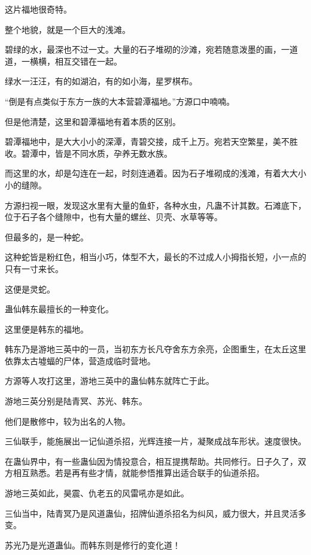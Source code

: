 
\begin{this_body}



这片福地很奇特。

整个地貌，就是一个巨大的浅滩。

碧绿的水，最深也不过一丈。大量的石子堆砌的沙滩，宛若随意泼墨的画，一道道，一横横，相互交错在一起。

绿水一汪汪，有的如湖泊，有的如小海，星罗棋布。

“倒是有点类似于东方一族的大本营碧潭福地。”方源口中喃喃。

但是他清楚，这里和碧潭福地有着本质的区别。

碧潭福地中，是大大小小的深潭，青碧交接，成千上万。宛若天空繁星，美不胜收。碧潭中，皆是不同水质，孕养无数水族。

而这里的水，却是勾连在一起，时刻连通着。因为石子堆砌成的浅滩，有着大大小小的缝隙。

方源扫视一眼，发现这水里有大量的鱼虾，各种水虫，凡蛊不计其数。石滩底下，位于石子各个缝隙中，也有大量的螺丝、贝壳、水草等等。

但最多的，是一种蛇。

这种蛇皆是粉红色，相当小巧，体型不大，最长的不过成人小拇指长短，小一点的只有一寸来长。

这便是灵蛇。

蛊仙韩东最擅长的一种变化。

这里便是韩东的福地。

韩东乃是游地三英中的一员，当初东方长凡夺舍东方余亮，企图重生，在太丘这里依靠太古墟蝠的尸体，营造成临时营地。

方源等人攻打这里，游地三英中的蛊仙韩东就阵亡于此。

游地三英分别是陆青冥、苏光、韩东。

他们是散修中，较为出名的人物。

三仙联手，能施展出一记仙道杀招，光辉连接一片，凝聚成战车形状。速度很快。

在蛊仙界中，有一些蛊仙因为情投意合，相互提携帮助。共同修行。日子久了，双方相互熟悉。若是再有些才情，就能参悟推算出适合联手的仙道杀招。

游地三英如此，昊震、仇老五的风雷吼亦是如此。

三仙当中，陆青冥乃是风道蛊仙，招牌仙道杀招名为纠风，威力很大，并且灵活多变。

苏光乃是光道蛊仙。而韩东则是修行的变化道！


\end{this_body}
